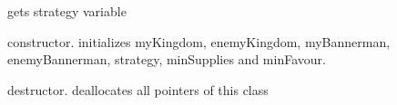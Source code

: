 \begin{DoxyRefList}
\item[Member \mbox{\hyperlink{class_strategy_a310550043f6b81592cef05ea9241144f}{Strategy\+::get\+Strategy\+Name}} ()]\label{todo__todo000015}%
%
gets strategy variable  
\item[Member \mbox{\hyperlink{class_strategy_abf2f11a2d8b44147caf0ea37863c90e2}{Strategy\+::Strategy}} (\mbox{\hyperlink{class_kingdom}{Kingdom}} $\ast$my\+Kingdom, \mbox{\hyperlink{class_kingdom}{Kingdom}} $\ast$enemy\+Kingdom, \mbox{\hyperlink{class_bannerman}{Bannerman}} $\ast$my\+Bannerman, \mbox{\hyperlink{class_bannerman}{Bannerman}} $\ast$enemy\+Bannerman, string name, int min, int min\+Favour)]\label{todo__todo000013}%
%
constructor. initializes my\+Kingdom, enemy\+Kingdom, my\+Bannerman, enemy\+Bannerman, strategy, min\+Supplies and min\+Favour.  
\item[Member \mbox{\hyperlink{class_strategy_a37c0bbdd64fd7dfcdd91578784a64775}{Strategy\+::$\sim$\+Strategy}} ()]\label{todo__todo000018}%
%
destructor. deallocates all pointers of this class 
\end{DoxyRefList}